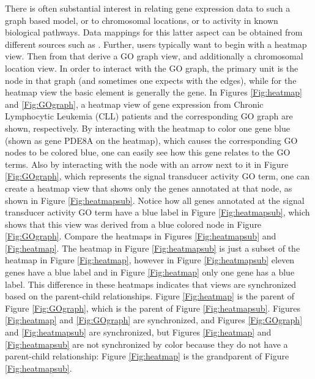 \documentclass[11pt]{article}
\begin{document}
There is often substantial interest in relating gene expression data
to such a graph based model, or to chromosomal locations, or to
activity in known biological pathways. Data mappings for this latter
aspect can be obtained from different sources such as \cite{KEGG}.
Further, users typically want to begin with a heatmap view. Then from
that derive a GO graph view, and additionally a chromosomal location
view. In order to interact with the GO graph, the primary unit is the
node in that graph (and sometimes one expects with the edges), while
for the heatmap view the basic element is generally the gene.  In Figures
\ref{Fig:heatmap} and \ref{Fig:GOgraph}, a heatmap view of gene expression
from Chronic Lymphocytic Leukemia (CLL) patients and the corresponding GO
graph are shown, respectively.  By interacting with the heatmap to color one
gene blue (shown as gene PDE8A on the heatmap), which causes the corresponding
GO nodes to be colored blue, one can easily see how this gene relates to the
GO terms.  Also by interacting with the node with an arrow next to it in
Figure \ref{Fig:GOgraph}, which represents the signal transducer activity GO
term, one can create a heatmap view that shows only the genes annotated at
that node, as shown in Figure \ref{Fig:heatmapsub}.  Notice how all genes
annotated at the signal transducer activity GO term have a blue label in
Figure \ref{Fig:heatmapsub}, which shows that this view was derived from a
blue colored node in Figure \ref{Fig:GOgraph}.  Compare the heatmaps in
Figures \ref{Fig:heatmapsub} and \ref{Fig:heatmap}.  The heatmap in Figure
\ref{Fig:heatmapsub} is just a subset of the heatmap in Figure
\ref{Fig:heatmap}, however in Figure \ref{Fig:heatmapsub} eleven genes have a
blue label and in Figure \ref{Fig:heatmap} only one gene has a blue label.
This difference in these heatmaps indicates that views are synchronized based
on the parent-child relationships.  Figure \ref{Fig:heatmap} is the parent of
Figure \ref{Fig:GOgraph}, which is the parent of Figure \ref{Fig:heatmapsub}.
Figures \ref{Fig:heatmap} and \ref{Fig:GOgraph} are synchronized, and Figures
\ref{Fig:GOgraph} and \ref{Fig:heatmapsub} are synchronized, but Figures
\ref{Fig:heatmap} and \ref{Fig:heatmapsub} are not synchronized by color
because they do not have a parent-child relationship: Figure \ref{Fig:heatmap}
is the grandparent of Figure \ref{Fig:heatmapsub}.
\end{document}
